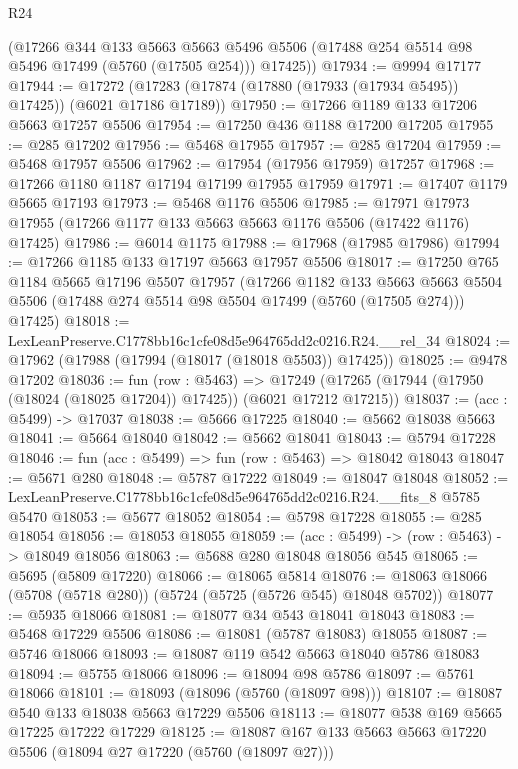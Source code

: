 \begin{lexlean}{R24}
\begin{coremodule}
      (@17266
        @344
        @133
        @5663
        @5663
        @5496
        @5506
        (@17488 @254 @5514 @98 @5496 @17499 (@5760 (@17505 @254)))
        @17425))
@17934 := @9994 @17177
@17944 := @17272 (@17283 (@17874 (@17880 (@17933 (@17934 @5495)) @17425)) (@6021 @17186 @17189))
@17950 := @17266 @1189 @133 @17206 @5663 @17257 @5506
@17954 := @17250 @436 @1188 @17200 @17205
@17955 := @285 @17202
@17956 := @5468 @17955
@17957 := @285 @17204
@17959 := @5468 @17957 @5506
@17962 := @17954 (@17956 @17959) @17257
@17968 := @17266 @1180 @1187 @17194 @17199 @17955 @17959
@17971 := @17407 @1179 @5665 @17193
@17973 := @5468 @1176 @5506
@17985 := @17971 @17973 @17955 (@17266 @1177 @133 @5663 @5663 @1176 @5506 (@17422 @1176) @17425)
@17986 := @6014 @1175
@17988 := @17968 (@17985 @17986)
@17994 := @17266 @1185 @133 @17197 @5663 @17957 @5506
@18017 := @17250
    @765
    @1184
    @5665
    @17196
    @5507
    @17957
    (@17266
      @1182
      @133
      @5663
      @5663
      @5504
      @5506
      (@17488 @274 @5514 @98 @5504 @17499 (@5760 (@17505 @274)))
      @17425)
@18018 := LexLeanPreserve.C1778bb16c1cfe08d5e964765dd2c0216.R24.__rel_34
@18024 := @17962 (@17988 (@17994 (@18017 (@18018 @5503)) @17425))
@18025 := @9478 @17202
@18036 := fun (row : @5463) =>
  @17249 (@17265 (@17944 (@17950 (@18024 (@18025 @17204)) @17425)) (@6021 @17212 @17215))
@18037 := (acc : @5499) -> @17037
@18038 := @5666 @17225
@18040 := @5662 @18038 @5663
@18041 := @5664 @18040
@18042 := @5662 @18041
@18043 := @5794 @17228
@18046 := fun (acc : @5499) => fun (row : @5463) => @18042 @18043
@18047 := @5671 @280
@18048 := @5787 @17222
@18049 := @18047 @18048
@18052 := LexLeanPreserve.C1778bb16c1cfe08d5e964765dd2c0216.R24.__fits_8 @5785 @5470
@18053 := @5677 @18052
@18054 := @5798 @17228
@18055 := @285 @18054
@18056 := @18053 @18055
@18059 := (acc : @5499) -> (row : @5463) -> @18049 @18056
@18063 := @5688 @280 @18048 @18056 @545
@18065 := @5695 (@5809 @17220)
@18066 := @18065 @5814
@18076 := @18063 @18066 (@5708 (@5718 @280)) (@5724 (@5725 (@5726 @545) @18048 @5702))
@18077 := @5935 @18066
@18081 := @18077 @34 @543 @18041 @18043
@18083 := @5468 @17229 @5506
@18086 := @18081 (@5787 @18083) @18055
@18087 := @5746 @18066
@18093 := @18087 @119 @542 @5663 @18040 @5786 @18083
@18094 := @5755 @18066
@18096 := @18094 @98 @5786
@18097 := @5761 @18066
@18101 := @18093 (@18096 (@5760 (@18097 @98)))
@18107 := @18087 @540 @133 @18038 @5663 @17229 @5506
@18113 := @18077 @538 @169 @5665 @17225 @17222 @17229
@18125 := @18087 @167 @133 @5663 @5663 @17220 @5506 (@18094 @27 @17220 (@5760 (@18097 @27)))

\end{coremodule}
\end{lexlean}
